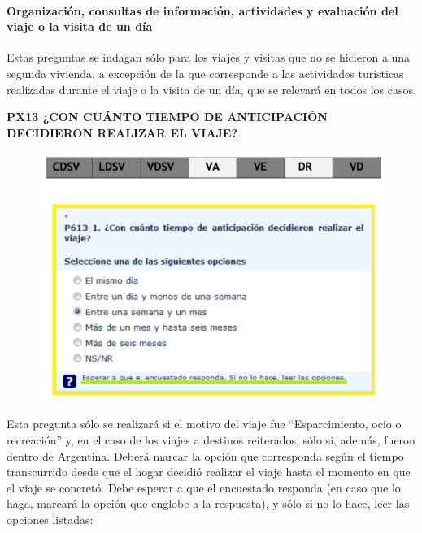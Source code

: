 \documentclass[
  openany]{book}
\begin{document}
\hypertarget{organizaciuxf3n-consultas-de-informaciuxf3n-actividades-y-evaluaciuxf3n-del-viaje-o-la-visita-de-un-duxeda}{%
\paragraph{Organización, consultas de información, actividades y evaluación del viaje o la visita de un día}\label{organizaciuxf3n-consultas-de-informaciuxf3n-actividades-y-evaluaciuxf3n-del-viaje-o-la-visita-de-un-duxeda}}

Estas preguntas se indagan sólo para los viajes y visitas que no se hicieron a una segunda vivienda, a excepción de la que corresponde a las actividades turísticas realizadas durante el viaje o la visita de un día, que se relevará en todos los casos.

\textbf{PX13 ¿CON CUÁNTO TIEMPO DE ANTICIPACIÓN DECIDIERON REALIZAR EL VIAJE?}

\begin{figure}

{\centering \includegraphics[width=1\linewidth]{imagenes/figura6-105} 

}

\end{figure}

Esta pregunta sólo se realizará si el motivo del viaje fue ``Esparcimiento, ocio o recreación'' y, en el caso de los viajes a destinos reiterados, sólo si, además, fueron dentro de Argentina. Deberá marcar la opción que corresponda según el tiempo transcurrido desde que el hogar decidió realizar el viaje hasta el momento en que el viaje se concretó. Debe esperar a que el encuestado responda (en caso que lo haga, marcará la opción que englobe a la respuesta), y sólo si no lo hace, leer las opciones listadas:
\end{document}

